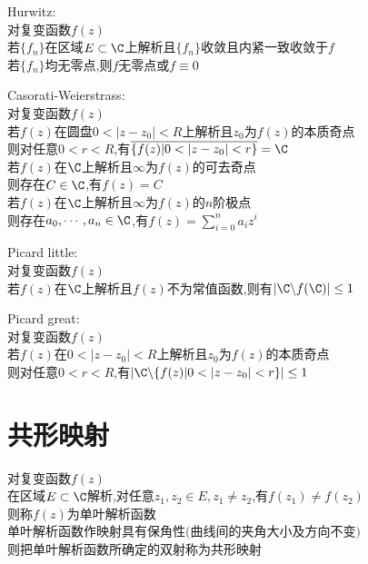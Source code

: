 \begin{dingli}
Hurwitz:\\
对复变函数$f(z)$\\
若$\{f_n\}$在区域$E\subset\C$上解析且$\{f_n\}$收敛且内紧一致收敛于$f$\\
若$\{f_n\}$均无零点,则$f$无零点或$f\equiv0$
\end{dingli}

\begin{dingli}
Casorati-Weierstrass:\\
对复变函数$f(z)$\\
若$f(z)$在圆盘$0<|z-z_0|<R$上解析且$z_0$为$f(z)$的本质奇点\\
则对任意$0<r<R$,有$\overline{\{f(z)|0<|z-z_0|<r\}}=\C$\\
若$f(z)$在$\C$上解析且$\infty$为$f(z)$的可去奇点\\
则存在$C\in\C$,有$f(z)=C$\\
若$f(z)$在$\C$上解析且$\infty$为$f(z)$的$n$阶极点\\
则存在$a_0,\cdots,a_n\in\C$,有$f(z)=\sum\limits_{i=0}^{n}a_iz^i$
\end{dingli}

\begin{dingli}
Picard little:\\
对复变函数$f(z)$\\
若$f(z)$在$\C$上解析且$f(z)$不为常值函数,则有$|\C\backslash f(\C)|\leq 1$
\end{dingli}

\begin{dingli}
Picard great:\\
对复变函数$f(z)$\\
若$f(z)$在$0<|z-z_0|<R$上解析且$z_0$为$f(z)$的本质奇点\\
则对任意$0<r<R$,有$|\C\backslash\{f(z)|0<|z-z_0|<r\}|\leq 1$
\end{dingli}

\chapter{共形映射}

\begin{dingyi}
对复变函数$f(z)$\\
在区域$E\subset\C$解析,对任意$z_1,z_2\in E,z_1\neq z_2$,有$f(z_1)\neq f(z_2)$\\
则称$f(z)$为单叶解析函数\\
单叶解析函数作映射具有保角性$($曲线间的夹角大小及方向不变$)$\\
则把单叶解析函数所确定的双射称为共形映射
\end{dingyi}


